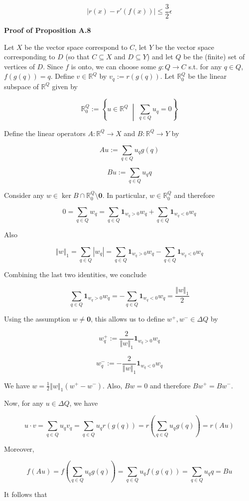 \documentclass[a4paper]{article}
\newcommand{\Co}[1]{}
\newcommand{\AP}[1]{\left(#1\right)}
\newcommand{\ACM}[2]{\left\{#1\;\middle\vert\;#2\right\}}
\newcommand{\Abs}[1]{\left\vert #1 \right\vert}
\newcommand{\Norm}[1]{\left\Vert #1 \right\Vert}
\newcommand{\Reals}{\mathbb{R}}
\DeclareMathOperator{\Ker}{ker}
\begin{document}
$$\Abs{r\AP{x}-r'\AP{f(x)}} \leq \frac{3}{2}\epsilon$$

\textbf{Proof of Proposition A.8}\Co{b}

Let $X$ be the vector space correspond to $C$, let $Y$ be the vector space corresponding to $D$ (so that $C\subseteq X$ and $D\subseteq Y$) and let $Q$ be the (finite) set of vertices of $D$. Since $f$ is onto, we can choose some $g:Q\rightarrow C$ s.t. for any $q\in Q$, $f\AP{g(q)}=q$. Define $v\in\Reals^Q$ by $v_q:=r\AP{g(q)}$. Let $\Reals^Q_0$ be the linear subspace of $\Reals^Q$ given by 

$$\Reals^Q_0:=\ACM{u\in\Reals^Q}{\sum_{q\in Q}u_q = 0}$$

Define the linear operators $A:\Reals^Q\rightarrow X$ and $B:\Reals^Q\rightarrow Y$ by

$$Au:=\sum_{q\in Q}u_q g(q)$$

$$Bu:=\sum_{q\in Q}u_q q$$

Consider any $w\in\Ker{B}\cap\Reals^Q_0\setminus\boldsymbol{0}$. In particular, $w\in\Reals^Q_0$ and therefore

$$0=\sum_{q\in Q}w_q=\sum_{q\in Q}\boldsymbol{1}_{w_q>0}w_q+\sum_{q\in Q}\boldsymbol{1}_{w_q<0}w_q$$

Also

$$\Norm{w}_1=\sum_{q\in Q}\Abs{w_q}=\sum_{q\in Q}\boldsymbol{1}_{w_q>0}w_q-\sum_{q\in Q}\boldsymbol{1}_{w_q<0}w_q$$

Combining the last two identities, we conclude

$$\sum_{q\in Q}\boldsymbol{1}_{w_q>0}w_q =-\sum_{q\in Q}\boldsymbol{1}_{w_q<0}w_q=\frac{\Norm{w}_1}{2}$$

Using the assumption $w\ne\boldsymbol{0}$, this allows us to define $w^+,w^-\in\Delta Q$ by

$$w^+_q:=\frac{2}{\Norm{w}_1}\boldsymbol{1}_{w_q>0}w_q$$

$$w^-_q:=-\frac{2}{\Norm{w}_1}\boldsymbol{1}_{w_q<0}w_q$$

We have $w=\frac{1}{2}\Norm{w}_1\AP{w^+-w^-}$. Also, $Bw=0$ and therefore $Bw^+=Bw^-$. 

Now, for any $u\in\Delta Q$, we have

$$u\cdot v=\sum_{q\in Q}u_q v_q=\sum_{q\in Q}u_q r\AP{g(q)}=r\AP{\sum_{q\in Q}u_q g(q)}=r\AP{Au}$$ 

Moreover,

$$f\AP{Au}=f\AP{\sum_{q\in Q}u_q g(q)}=\sum_{q\in Q}u_q f\AP{g(q)}=\sum_{q\in Q}u_q q = Bu$$

It follows that
\end{document}
